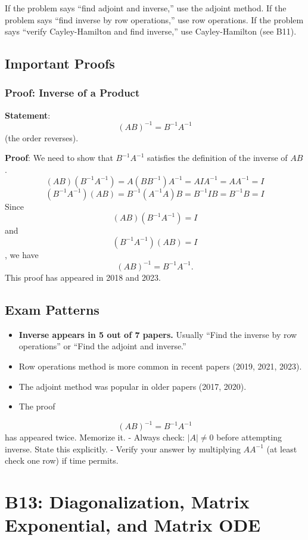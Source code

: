 \documentclass[
]{article}
\providecommand{\tightlist}{%
  \setlength{\itemsep}{0pt}\setlength{\parskip}{0pt}}
\begin{document}
If the problem says ``find adjoint and inverse,'' use the adjoint
method. If the problem says ``find inverse by row operations,'' use row
operations. If the problem says ``verify Cayley-Hamilton and find
inverse,'' use Cayley-Hamilton (see B11).

\subsection{Important Proofs}\label{important-proofs}

\subsubsection{Proof: Inverse of a
Product}\label{proof-inverse-of-a-product}

\textbf{Statement}:
\[
(AB)^{-1} = B^{-1}A^{-1}
\]
(the order reverses).

\textbf{Proof}: We need to show that \(B^{-1}A^{-1}\) satisfies the
definition of the inverse of \(AB\).
\[
(AB)(B^{-1}A^{-1}) = A(BB^{-1})A^{-1} = AIA^{-1} = AA^{-1} = I
\]
\[
(B^{-1}A^{-1})(AB) = B^{-1}(A^{-1}A)B = B^{-1}IB = B^{-1}B = I
\]
Since
\[
(AB)(B^{-1}A^{-1}) = I
\]
and
\[
(B^{-1}A^{-1})(AB) = I
\]
, we have
\[
(AB)^{-1} = B^{-1}A^{-1}.
\]
This proof has appeared in 2018 and 2023.

\subsection{Exam Patterns}\label{exam-patterns-27}

\begin{itemize}
\tightlist
\item
  \textbf{Inverse appears in 5 out of 7 papers.} Usually ``Find the
  inverse by row operations'' or ``Find the adjoint and inverse.''
\item
  Row operations method is more common in recent papers (2019, 2021,
  2023).
\item
  The adjoint method was popular in older papers (2017, 2020).
\item
  The proof
\end{itemize}
\[
(AB)^{-1} = B^{-1}A^{-1}
\]
has appeared twice. Memorize it. - Always check:
\(\lvert A \rvert \neq 0\) before attempting inverse. State this
explicitly. - Verify your answer by multiplying \(AA^{-1}\) (at least
check one row) if time permits.

\section{B13: Diagonalization, Matrix Exponential, and Matrix
ODE}\label{b13-diagonalization-matrix-exponential-and-matrix-ode}
\end{document}
